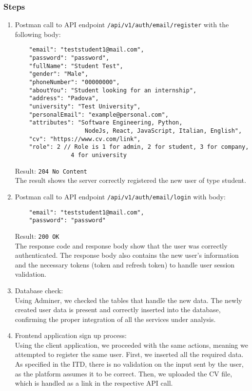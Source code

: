 \subsubsection*{Steps}
\begin{enumerate}
    \item Postman call to API endpoint \verb|/api/v1/auth/email/register| with the following body:
    \begin{verbatim}
    "email": "teststudent1@mail.com",
    "password": "password",
    "fullName": "Student Test",
    "gender": "Male",
    "phoneNumber": "00000000",
    "aboutYou": "Student looking for an internship",
    "address": "Padova",
    "university": "Test University",
    "personalEmail": "example@personal.com",
    "attributes": "Software Engineering, Python,
                    NodeJs, React, JavaScript, Italian, English",
    "cv": "https://www.cv.com/link",
    "role": 2 // Role is 1 for admin, 2 for student, 3 for company,
                4 for university
    \end{verbatim}
    Result: \verb|204 No Content|\\
    The result shows the server correctly registered the new user of type student.
    \item Postman call to API endpoint \verb|/api/v1/auth/email/login| with body:
    \begin{verbatim}
    "email": "teststudent1@mail.com",
    "password": "password"
    \end{verbatim}
    Result: \verb|200 OK|\\
   The response code and response body show that the user was correctly authenticated. The response body also contains the new user's information and the necessary tokens (token and refresh token) to handle user session validation.
    \item Database check:\\
    Using Adminer, we checked the tables that handle the new data. The newly created user data is present and correctly inserted into the database, confirming the proper integration of all the services under analysis.
    \item Frontend application sign up process:\\
    Using the client application, we proceeded with the same actions, meaning we attempted to register the same user. First, we inserted all the required data. As specified in the ITD, there is no validation on the input sent by the user, as the platform assumes it to be correct. Then, we uploaded the CV file, which is handled as a link in the respective API call.


\end{enumerate}
